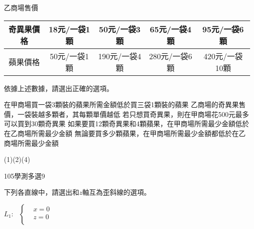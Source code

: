 \begin{QUESTIONS}
\begin{QUESTION}
\begin{QBODY}
\begin{tabular}{|c|c|c|c|c|}
			\end{tabular}
			乙商場售價
			\begin{tabular}{|c|c|c|c|c|}
			\hline			
			奇異果價格  & 18元/一袋1顆	& 50元/一袋3顆	& 65元/一袋4顆	& 95元/一袋6顆 \\\hline
			蘋果價格	& 50元/一袋1顆	& 190元/一袋4顆	& 280元/一袋6顆	& 420元/一袋10顆\\\hline
			\end{tabular}
			依據上述數據，請選出正確的選項。
			\begin{QOPS}
				\QOP 在甲商場買一袋3顆裝的蘋果所需金額低於買三袋1顆裝的蘋果
				\QOP 乙商場的奇異果售價，一袋裝越多顆者，其每顆單價越低
				\QOP 若只想買奇異果，則在甲商場花500元最多可以買到30顆奇異果
				\QOP 如果要買12顆奇異果和4顆蘋果，在甲商場所需最少金額低於在乙商場所需最少金額
				\QOP 無論要買多少顆蘋果，在甲商場所需最少金額都低於在乙商場所需最少金額
			\end{QOPS}
        \end{QBODY}
        \begin{QFROMS}
        \end{QFROMS}
        \begin{QTAGS}\end{QTAGS}
        \begin{QANS}
            (1)(2)(4)
        \end{QANS}
        \begin{QSOLLIST}
        \end{QSOLLIST}
        \begin{QEMPTYSPACE}
        \end{QEMPTYSPACE}
    \end{QUESTION}
    \begin{QUESTION}
        \begin{ExamInfo}{105}{學測}{多選}{9}
        \end{ExamInfo}
        \begin{ExamAnsRateInfo}{46}{77}{40}{21}
        \end{ExamAnsRateInfo}
        \begin{QBODY}
            下列各直線中，請選出和$z$軸互為歪斜線的選項。
			\begin{QOPS}
				\QOP ${{L}_{1}}:\text{ }\left\{ \begin{aligned}
				  & x=0 \\ 
				 & z=0 \\ 
				\end{aligned} \right.$	

\end{QOPS}
\end{QBODY}
\end{QUESTION}
\end{QUESTIONS}
